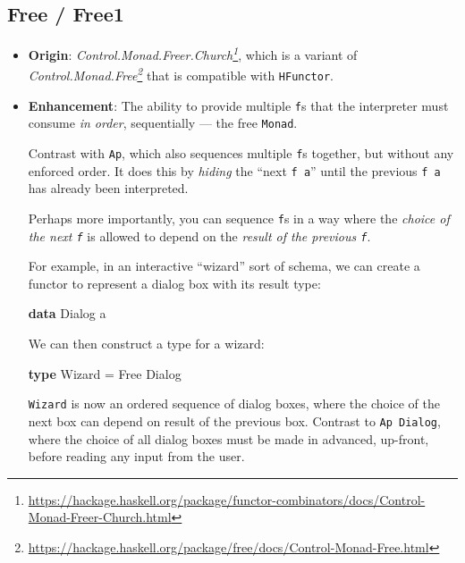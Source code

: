 \documentclass[]{article}
\newenvironment{Shaded}{}{}
\newcommand{\DataTypeTok}[1]{\textcolor[rgb]{0.56,0.13,0.00}{#1}}
\newcommand{\KeywordTok}[1]{\textcolor[rgb]{0.00,0.44,0.13}{\textbf{#1}}}
\newcommand{\NormalTok}[1]{#1}
\newcommand{\OtherTok}[1]{\textcolor[rgb]{0.00,0.44,0.13}{#1}}
\renewcommand{\href}[2]{#2\footnote{\url{#1}}}
\begin{document}
\hypertarget{free-free1}{%
\subsection{Free / Free1}\label{free-free1}}

\begin{itemize}
\item
  \textbf{Origin}:
  \emph{\href{https://hackage.haskell.org/package/functor-combinators/docs/Control-Monad-Freer-Church.html}{Control.Monad.Freer.Church}},
  which is a variant of
  \emph{\href{https://hackage.haskell.org/package/free/docs/Control-Monad-Free.html}{Control.Monad.Free}}
  that is compatible with \texttt{HFunctor}.
\item
  \textbf{Enhancement}: The ability to provide multiple \texttt{f}s that the
  interpreter must consume \emph{in order}, sequentially --- the free
  \texttt{Monad}.

  Contrast with \texttt{Ap}, which also sequences multiple \texttt{f}s together,
  but without any enforced order. It does this by \emph{hiding} the ``next
  \texttt{f\ a}'' until the previous \texttt{f\ a} has already been interpreted.

  Perhaps more importantly, you can sequence \texttt{f}s in a way where the
  \emph{choice of the next \texttt{f}} is allowed to depend on the \emph{result
  of the previous \texttt{f}}.

  For example, in an interactive ``wizard'' sort of schema, we can create a
  functor to represent a dialog box with its result type:

\begin{Shaded}
\begin{Highlighting}[]
\KeywordTok{data} \DataTypeTok{Dialog}\NormalTok{ a}
\end{Highlighting}
\end{Shaded}

  We can then construct a type for a wizard:

\begin{Shaded}
\begin{Highlighting}[]
\KeywordTok{type} \DataTypeTok{Wizard} \OtherTok{=} \DataTypeTok{Free} \DataTypeTok{Dialog}
\end{Highlighting}
\end{Shaded}

  \texttt{Wizard} is now an ordered sequence of dialog boxes, where the choice
  of the next box can depend on result of the previous box. Contrast to
  \texttt{Ap\ Dialog}, where the choice of all dialog boxes must be made in
  advanced, up-front, before reading any input from the user.


\end{itemize}
\end{document}
